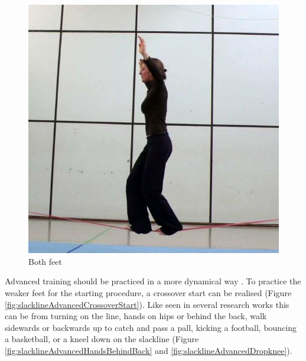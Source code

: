 \begin{figure}[htb]
\begin{minipage}[t]{0.33\linewidth}
		\includegraphics[width=1\linewidth]{Pictures/slacklineBasicBothFeet}
		\caption{Both feet \cite{Kroiss2007-ab}}
		\label{fig:slacklineBasicBothFeet}
	\end{minipage}
\end{figure}

Advanced training should be practiced in a more dynamical way \cite{Thomann2013-aa}. To practice the weaker feet for the starting procedure, a crossover start can be realised (Figure \ref{fig:slacklineAdvancedCrossoverStart}). Like seen in several research works \cite{Donath2013-kk} \cite{Donath2016-gm} \cite{Keller2012-xh} \cite{Granacher2010-ow} \cite{Pfusterschmied2013-yy} this can be from turning on the line, hands on hips or behind the back, walk sidewards or backwards up to catch and pass a pall, kicking a football, bouncing a basketball, or a kneel down on the slackline (Figure \ref{fig:slacklineAdvancedHandsBehindBack} and \ref{fig:slacklineAdvancedDropknee}).

